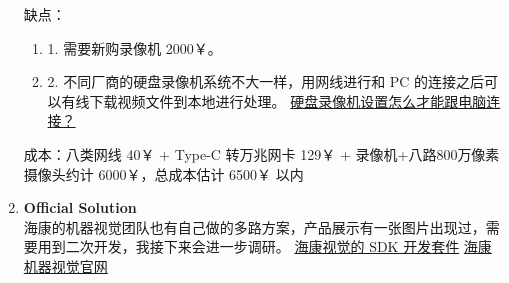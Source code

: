 \begin{enumerate}
    
    缺点：
    \begin{enumerate}
        \item 1. 需要新购录像机 2000￥。
        \item 2. 不同厂商的硬盘录像机系统不大一样，用网线进行和 PC 的连接之后可以有线下载视频文件到本地进行处理。
        \href{https://iask.sina.com.cn/b/6gqyGEWCCKd.html}{硬盘录像机设置怎么才能跟电脑连接？}
    \end{enumerate}

    成本：八类网线 40￥ + Type-C 转万兆网卡 129￥ + 录像机+八路800万像素摄像头约计 6000￥，总成本估计 6500￥ 以内

    \item \textbf{Official Solution}\\   
    海康的机器视觉团队也有自己做的多路方案，产品展示有一张图片出现过，需要用到二次开发，我接下来会进一步调研。
    \href{https://www.hikvision.com/cn/download_61.html}{海康视觉的 SDK 开发套件}
    \href{https://www.hikrobotics.com/vision/visionlist.htm}{海康机器视觉官网}
\end{enumerate}


